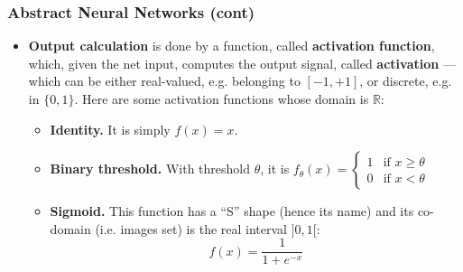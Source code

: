 %
\begin{frame}
\frametitle{Abstract Neural Networks (cont)}

\begin{itemize}

  \item \textbf{Output calculation} is done by a function, called
  \textbf{activation function}, which, given the net input, computes
  the output signal, called \textbf{activation} --- which can be
  either real-valued, e.g. belonging to \([-1,+1]\), or discrete,
  e.g. in \(\{0,1\}\). Here are some activation functions whose domain is
  \(\mathbb{R}\):
  \begin{itemize}

    \item \textbf{Identity.} It is simply $f(x) = x$.

    \item \textbf{Binary threshold.} With threshold $\theta$, it is
    \(
      f_{\theta}(x) = \begin{cases}
                        1 & \text{if } x \geqslant \theta\\
                        0 & \text{if } x < \theta
                      \end{cases}      
    \)

    \item \textbf{Sigmoid.} This function has a ``S'' shape (hence
    its name) and its co-domain (i.e. images set) is the real interval
    $]0,1[$: \[f(x) = \frac{1}{1 + e^{-x}}\]

  \end{itemize}

\end{itemize}

\end{frame}

